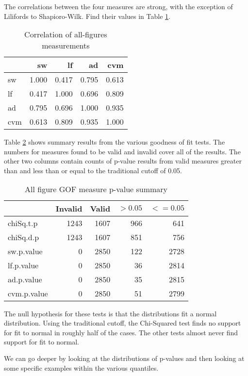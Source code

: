 The correlations between the four measures are strong, with the exception
of Lilifords to Shapioro-Wilk. Find their values in Table \ref{table:allcorr}.

\begin{table}[tbp]
  \begin{tabular}{l | r r r r}
  & sw & lf & ad & cvm \\
   \hline
  sw   & 1.000  & 0.417  & 0.795   & 0.613 \\
  lf   & 0.417  & 1.000  & 0.696   & 0.809 \\
  ad   & 0.795  & 0.696  & 1.000   & 0.935 \\
  cvm  & 0.613  & 0.809  & 0.935   & 1.000 \\
  \end{tabular}
  \caption{Correlation of all-figures measurements}
  \label{table:allcorr}
\end{table}

Table \ref{table:allsumm} shows summary results from the various goodness
of fit tests.
The numbers for measures found to be valid and invalid cover all of the
results.
The other two columns contain counts of p-value results from valid measures
greater than and less than or equal to the traditional cutoff of 0.05.

\begin{table}[tbp]
\centering
\begin{tabular}{l | r r r r}
& Invalid & Valid & $> 0.05$ & $<= 0.05$ \\
 \hline
chiSq.t.p   & 1243 & 1607 &  966 &  641 \\
chiSq.d.p   & 1243 & 1607 &  851 &  756 \\
sw.p.value  &    0 & 2850 &  122 & 2728 \\
lf.p.value  &    0 & 2850 &   36 & 2814 \\
ad.p.value  &    0 & 2850 &   35 & 2815 \\
cvm.p.value &    0 & 2850 &   51 & 2799 \\
\end{tabular}
\caption{All figure GOF measure p-value summary}
\label{table:allsumm}
\end{table}

The null hypothesis for these tests is that the distributions fit a normal
distribution. Using the traditional cutoff,
the Chi-Squared test finds no support for fit to normal in roughly half
of the cases.
The other tests almost never find support for fit to normal.

We can go deeper by looking at the distributions of p-values and then
looking at some specific examples within the various quantiles.

